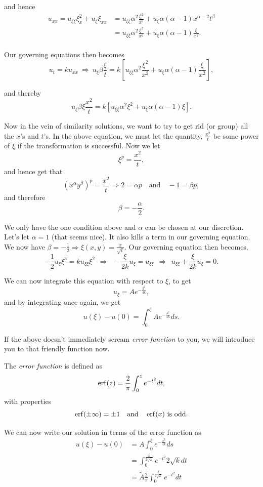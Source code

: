 \begin{enumerate}
and hence
\begin{align*}
u_{xx} = u_{\xi\xi} \xi_x^2 + u_\xi \xi_{xx} &= u_{\xi\xi} \alpha^2 \frac{\xi^2}{x^2} + u_\xi \alpha(\alpha-1) x^{\alpha-2}t^\beta \\
&= u_{\xi\xi}\alpha^2 \frac{\xi^2}{x^2} + u_\xi \alpha(\alpha-1) \frac{\xi}{x^2}.\\
\end{align*}
  
Our governing equations then becomes $$u_t = ku_{xx} \ \Rightarrow \ u_{\xi}\beta\frac{\xi}{t} = k\left[ u_{\xi\xi} \alpha^2 \frac{\xi^2}{x^2} + u_\xi\alpha(\alpha-1)\frac{\xi}{x^2}  \right],$$

and thereby
$$u_\xi \beta\xi \frac{x^2}{t} = k\left[ u_{\xi\xi} \alpha^2 \xi^2 + u_\xi \alpha(\alpha-1)\xi  \right].$$

Now in the vein of similarity solutions, we want to try to get rid (or group) all the $x$'s and $t$'s. In the above equation, we must let the quantity, $\frac{x^2}{t}$ be some power of $\xi$ if the transformation is successful. Now we let $$\xi^p = \frac{x^2}{t},$$ and hence get that $$(x^\alpha y^\beta)^p = \frac{x^2}{t} \Rightarrow 2=\alpha p \ \ \ \mbox{ and } \ \ \ -1 = \beta p,$$ and therefore $$\beta = -\frac{\alpha}{2}.$$

We only have the one condition above and $\alpha$ can be chosen at our discretion. Let's let $\alpha=1$ (that seems nice). It also kills a term in our governing equation. We now have $\beta = -\frac{1}{2} \Rightarrow \xi(x,y) = \frac{x}{\sqrt{t}}.$ Our governing equation then becomes,
$$-\frac{1}{2} u_{\xi} \xi^3 = k u_{\xi\xi} \xi^2 \ \ \Rightarrow \ \ -\frac{\xi}{2k} u_{\xi} = u_{\xi\xi} \ \ \Rightarrow \ \ u_{\xi\xi} + \frac{\xi}{2k} u_{\xi} = 0.$$

We can now integrate this equation with respect to $\xi$, to get $$u_{\xi} = Ae^{-\frac{\xi^2}{4k}},$$ and by integrating once again, we get $$u(\xi) - u(0) = \int_{0}^{\xi} A e^{-\frac{s^2}{4k}} ds.$$

If the above doesn't immediately scream \emph{error function} to you, we will introduce you to that friendly function now. 

\begin{definition}
The \emph{error function} is defined as $$\operatorname{erf}(z) = \frac{2}{\pi} \int_{0}^z e^{-t^2} dt,$$ with properties $$\erf(\pm\infty) = \pm 1 \ \ \ \mbox{and} \ \ \ \erf(x) \ \mbox{is odd}.$$
\end{definition}

We can now write our solution in terms of the error function as 
\begin{align*}
u(\xi) - u(0) &= A \int_{0}^{\xi} e^{-\frac{s^2}{4k}} ds \\
&= \int_0^{\frac{\xi}{2\sqrt{k}}} e^{-t^2} 2\sqrt{k} dt \\
&= \tilde{A} \frac{2}{\pi} \int_0^{\frac{\xi}{2\sqrt{k}}} e^{-t^2} dt \\
\end{align*}


\end{enumerate}
